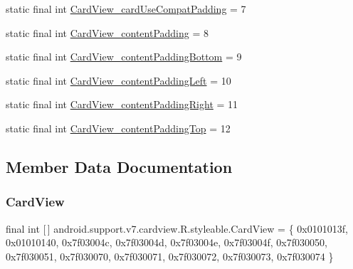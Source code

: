 \begin{DoxyCompactItemize}
\item 
static final int \mbox{\hyperlink{classandroid_1_1support_1_1v7_1_1cardview_1_1R_1_1styleable_a81488637df7c7efd9ddbed939a554da2}{Card\+View\+\_\+card\+Use\+Compat\+Padding}} = 7
\item 
static final int \mbox{\hyperlink{classandroid_1_1support_1_1v7_1_1cardview_1_1R_1_1styleable_ad997e05e368740f5fcb63ef1a2d422b4}{Card\+View\+\_\+content\+Padding}} = 8
\item 
static final int \mbox{\hyperlink{classandroid_1_1support_1_1v7_1_1cardview_1_1R_1_1styleable_a97a00c6e1c432a829a01af44c3a94934}{Card\+View\+\_\+content\+Padding\+Bottom}} = 9
\item 
static final int \mbox{\hyperlink{classandroid_1_1support_1_1v7_1_1cardview_1_1R_1_1styleable_a6eee54b4a25fb2937c69b56092ab3d8b}{Card\+View\+\_\+content\+Padding\+Left}} = 10
\item 
static final int \mbox{\hyperlink{classandroid_1_1support_1_1v7_1_1cardview_1_1R_1_1styleable_aa839ccb69f7ce19cb780a27be7b3964a}{Card\+View\+\_\+content\+Padding\+Right}} = 11
\item 
static final int \mbox{\hyperlink{classandroid_1_1support_1_1v7_1_1cardview_1_1R_1_1styleable_adac8b5623f012026b077e7f6730f2b65}{Card\+View\+\_\+content\+Padding\+Top}} = 12
\end{DoxyCompactItemize}


\subsection{Member Data Documentation}
\mbox{\label{classandroid_1_1support_1_1v7_1_1cardview_1_1R_1_1styleable_ad08b98a07471f174f404c58941fc82ca}} 
\subsubsection{\texorpdfstring{Card\+View}{CardView}}
{\footnotesize\ttfamily final int \mbox{[}$\,$\mbox{]} android.\+support.\+v7.\+cardview.\+R.\+styleable.\+Card\+View = \{ 0x0101013f, 0x01010140, 0x7f03004c, 0x7f03004d, 0x7f03004e, 0x7f03004f, 0x7f030050, 0x7f030051, 0x7f030070, 0x7f030071, 0x7f030072, 0x7f030073, 0x7f030074 \}\hspace{0.3cm}{\ttfamily [static]}}

